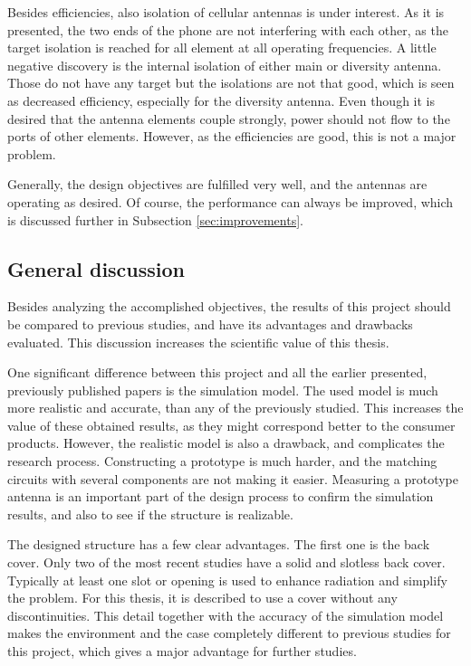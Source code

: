 Besides efficiencies, also isolation of cellular antennas is under interest. As it is presented, the two ends of the phone are not interfering with each other, as the target isolation is reached for all element at all operating frequencies. A little negative discovery is the internal isolation of either main or diversity antenna. Those do not have any target but the isolations are not that good, which is seen as decreased efficiency, especially for the diversity antenna. Even though it is desired that the antenna elements couple strongly, power should not flow to the ports of other elements. However, as the efficiencies are good, this is not a major problem.

Generally, the design objectives are fulfilled very well, and the antennas are operating as desired. Of course, the performance can always be improved, which is discussed further in Subsection \ref{sec:improvements}.


\subsection{General discussion}
\label{sec:general_discussion}
Besides analyzing the accomplished objectives, the results of this project should be compared to previous studies, and have its advantages and drawbacks evaluated. This discussion increases the scientific value of this thesis.

One significant difference between this project and all the earlier presented, previously published papers is the simulation model. The used model is much more realistic and accurate, than any of the previously studied. This increases the value of these obtained results, as they might correspond better to the consumer products. However, the realistic model is also a drawback, and complicates the research process. Constructing a prototype is much harder, and the matching circuits with several components are not making it easier. Measuring a prototype antenna is an important part of the design process to confirm the simulation results, and also to see if the structure is realizable.

The designed structure has a few clear advantages. The first one is the back cover. Only two of the most recent studies have a solid and slotless back cover. Typically at least one slot or opening is used to enhance radiation and simplify the problem. For this thesis, it is described to use a cover without any discontinuities. This detail together with the accuracy of the simulation model makes the environment and the case completely different to previous studies for this project, which gives a major advantage for further studies. 

